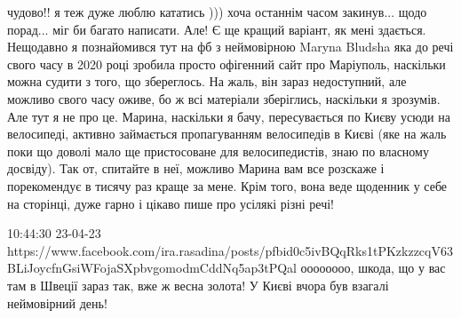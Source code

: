 чудово!! я теж дуже люблю кататись ))) хоча останнім часом закинув... щодо
порад... міг би багато написати. Але! Є ще кращий варіант, як мені здається.
Нещодавно я познайомився тут на фб з неймовірною Maryna Bludsha яка до речі
свого часу в 2020 році зробила просто офігенний сайт про Маріуполь, наскільки
можна судити з того, що збереглось. На жаль, він зараз недоступний, але можливо
свого часу оживе, бо ж всі матеріали зберіглись, наскільки я зрозумів. Але тут
я не про це. Марина, наскільки я бачу, пересувається по Києву усюди на
велосипеді, активно займається пропагуванням велосипедів в Києві (яке на жаль
поки що доволі мало ще пристосоване для велосипедистів, знаю по власному
досвіду). Так от, спитайте в неї, можливо Марина вам все розскаже і
порекомендує в тисячу раз краще за мене. Крім того, вона веде щоденник у себе
на сторінці, дуже гарно і цікаво пише про усілякі різні речі!

10:44:30 23-04-23
https://www.facebook.com/ira.rasadina/posts/pfbid0c5ivBQqRks1tPKzkzzcqV63BLiJoycfnGsiWFojaSXpbvgomodmCddNq5ap3tPQal
оооооооо, шкода, що у вас там в Швеції зараз так, вже ж весна золота! У Києві
вчора був взагалі неймовірний день!
